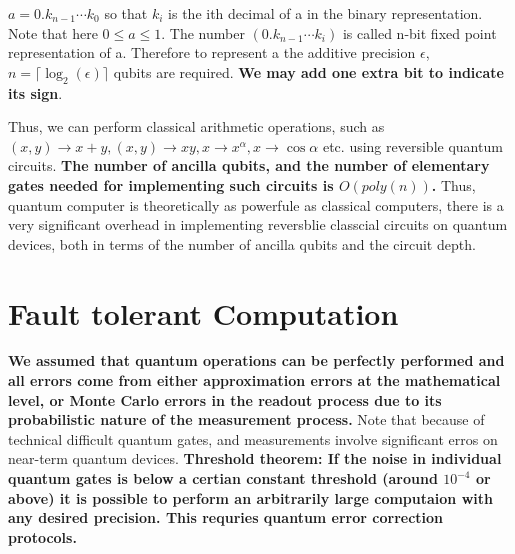 \documentclass[12pt, oneside]{book}
\theoremstyle{definition}
\theoremstyle{definition}
\theoremstyle{remark}
\begin{document}
$a=0.k_{n-1}\cdots k_0$ so that $k_i$ is the ith decimal of a in the binary representation. Note that here $0\leq a\leq 1$.
The number $(0.k_{n-1}\cdots k_i)$ is called n-bit fixed point representation of a. Therefore to represent a the additive precision $\epsilon$,
$n=\lceil\log_2(\epsilon)\rceil$ qubits are required. \textbf{We may add one extra bit to indicate its sign}.
 
Thus, we can perform classical arithmetic operations, such as $(x,y)\rightarrow x+y,(x,y)\rightarrow xy,x \rightarrow x^{\alpha}, x\rightarrow \cos\alpha $ etc.
using reversible quantum circuits. \textbf{The number of ancilla qubits, and the number of elementary gates needed for implementing such circuits is $O(poly(n))$.}
Thus, quantum computer is theoretically as powerfule as classical computers, there is a very significant overhead in implementing reversblie classcial circuits on quantum devices, both in terms of the number
of ancilla qubits and the circuit depth.
 
\section{Fault tolerant Computation}
\textbf{We assumed that quantum operations can be perfectly performed and all errors come from either approximation errors at the mathematical level,
or Monte Carlo errors in the readout process due to its probabilistic nature of the measurement process.}
Note that because of technical difficult quantum gates, and measurements involve significant erros on near-term quantum devices.
\textbf{Threshold theorem: If the noise in individual quantum gates is below a certian constant threshold (around $10^{-4}$ or above) it is possible to perform an arbitrarily
large computaion with any desired precision. This requries quantum error correction protocols.}
\end{document}

